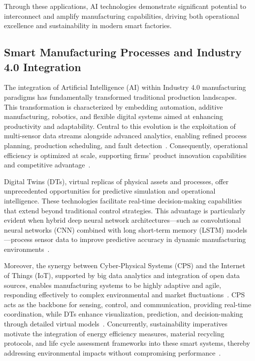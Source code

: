 \documentclass[sigconf]{acmart}
\begin{document}
Through these applications, AI technologies demonstrate significant potential to interconnect and amplify manufacturing capabilities, driving both operational excellence and sustainability in modern smart factories.

\subsection{Smart Manufacturing Processes and Industry 4.0 Integration}

The integration of Artificial Intelligence (AI) within Industry 4.0 manufacturing paradigms has fundamentally transformed traditional production landscapes. This transformation is characterized by embedding automation, additive manufacturing, robotics, and flexible digital systems aimed at enhancing productivity and adaptability. Central to this evolution is the exploitation of multi-sensor data streams alongside advanced analytics, enabling refined process planning, production scheduling, and fault detection~\cite{ref6,ref7,ref33,ref35}. Consequently, operational efficiency is optimized at scale, supporting firms’ product innovation capabilities and competitive advantage~\cite{ref20}.   

Digital Twins (DTs), virtual replicas of physical assets and processes, offer unprecedented opportunities for predictive simulation and operational intelligence. These technologies facilitate real-time decision-making capabilities that extend beyond traditional control strategies. This advantage is particularly evident when hybrid deep neural network architectures—such as convolutional neural networks (CNN) combined with long short-term memory (LSTM) models—process sensor data to improve predictive accuracy in dynamic manufacturing environments~\cite{ref31,ref33,ref35}.  

Moreover, the synergy between Cyber-Physical Systems (CPS) and the Internet of Things (IoT), supported by big data analytics and integration of open data sources, enables manufacturing systems to be highly adaptive and agile, responding effectively to complex environmental and market fluctuations~\cite{ref9,ref20,ref22}. CPS acts as the backbone for sensing, control, and communication, providing real-time coordination, while DTs enhance visualization, prediction, and decision-making through detailed virtual models~\cite{ref22}. Concurrently, sustainability imperatives motivate the integration of energy efficiency measures, material recycling protocols, and life cycle assessment frameworks into these smart systems, thereby addressing environmental impacts without compromising performance~\cite{ref38,ref41}.  
\end{document}
